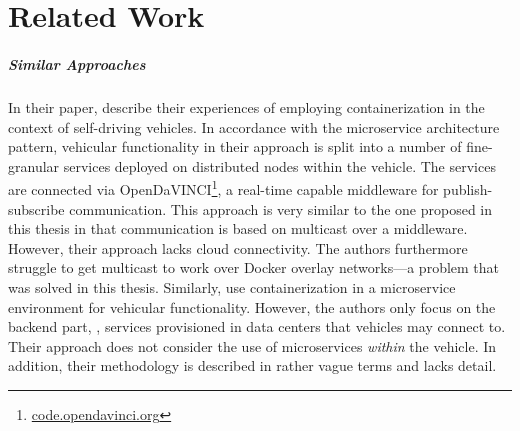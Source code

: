 \chapter{Related Work}\label{chapter:related-work}

\paragraph{Similar Approaches}

In their paper, \citeauthor*{berger2017containerized} \cite{berger2017containerized} describe their experiences of employing containerization in the context of self-driving vehicles. 
In accordance with the microservice architecture pattern, vehicular functionality in their approach is split into a number of fine-granular services deployed on distributed nodes within the vehicle. The services are connected via OpenDaVINCI\footnote{\url{code.opendavinci.org}}, a real-time capable middleware for publish-subscribe communication. This approach is very similar to the one proposed in this thesis in that communication is based on multicast over a middleware. However, their approach lacks cloud connectivity. The authors furthermore struggle to get multicast to work over Docker overlay networks---a problem that was solved in this thesis.
Similarly, \citeauthor*{schneider2016achieving} \cite{schneider2016achieving} use containerization in a microservice environment for vehicular functionality. However, the authors only focus on the backend part, \ie , services provisioned in data centers that vehicles may connect to. Their approach does not consider the use of microservices \emph{within} the vehicle. In addition, their methodology is described in rather vague terms and lacks detail.


